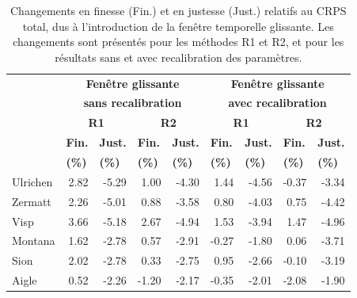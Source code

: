\documentclass[hess]{copernicus}
\begin{document}
\begin{table}[h]
	\caption{Changements en finesse (Fin.) et en justesse (Just.) relatifs au CRPS total, dus à l'introduction de la fenêtre temporelle glissante. Les changements sont présentés pour les méthodes R1 et R2, et pour les résultats sans et avec recalibration des paramètres.}
	\begin{center}
		\begin{tabular}{|l|r r|r r|r r|r r|}
			\cline{2-9}
			\multicolumn{1}{l}{} & \multicolumn{ 4}{|c|}{\textbf{Fenêtre glissante}} & \multicolumn{ 4}{c|}{\textbf{Fenêtre glissante}} \\
			\multicolumn{1}{l}{} & \multicolumn{ 4}{|c|}{\textbf{sans recalibration}} & \multicolumn{ 4}{c|}{\textbf{avec recalibration}} \\
			\multicolumn{1}{l}{} & \multicolumn{ 2}{|c|}{\textbf{R1}} & \multicolumn{ 2}{c|}{\textbf{R2}} & \multicolumn{ 2}{c|}{\textbf{R1}} & \multicolumn{ 2}{c|}{\textbf{R2}} \\
			\multicolumn{1}{l}{} & \multicolumn{1}{|l}{\textbf{Fin.}} & \multicolumn{1}{l|}{\textbf{Just.}} & \multicolumn{1}{l}{\textbf{Fin.}} & \multicolumn{1}{l|}{\textbf{Just.}} & \multicolumn{1}{l}{\textbf{Fin.}} & \multicolumn{1}{l|}{\textbf{Just.}} & \multicolumn{1}{l}{\textbf{Fin.}} & \multicolumn{1}{l|}{\textbf{Just.}} \\
			\multicolumn{1}{l}{} & \multicolumn{1}{|l}{\textbf{(\%)}} & \multicolumn{1}{l|}{\textbf{(\%)}} & \multicolumn{1}{l}{\textbf{(\%)}} & \multicolumn{1}{l|}{\textbf{(\%)}} & \multicolumn{1}{l}{\textbf{(\%)}} & \multicolumn{1}{l|}{\textbf{(\%)}} & \multicolumn{1}{l}{\textbf{(\%)}} & \multicolumn{1}{l|}{\textbf{(\%)}} \\ \hline
			Ulrichen & 2.82 & -5.29 & 1.00 & -4.30 & 1.44 & -4.56 & -0.37 & -3.34 \\ \hline
			Zermatt & 2.26 & -5.01 & 0.88 & -3.58 & 0.80 & -4.03 & 0.75 & -4.42 \\ \hline
			Visp & 3.66 & -5.18 & 2.67 & -4.94 & 1.53 & -3.94 & 1.47 & -4.96 \\ \hline
			Montana & 1.62 & -2.78 & 0.57 & -2.91 & -0.27 & -1.80 & 0.06 & -3.71 \\ \hline
			Sion & 2.02 & -2.78 & 0.33 & -2.75 & 0.95 & -2.66 & -0.10 & -3.19 \\ \hline
			Aigle & 0.52 & -2.26 & -1.20 & -2.17 & -0.35 & -2.01 & -2.08 & -1.90 \\ \hline
		\end{tabular}
	\end{center}
	\label{tab:fenetre_glissante:Resultats_justesse_finesse}
\end{table}
\end{document}
